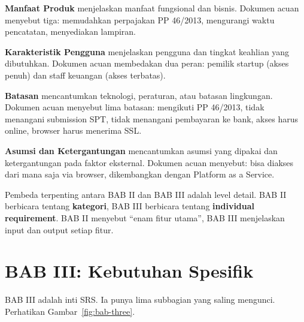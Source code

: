 \documentclass[11pt,a4paper]{article}
\begin{document}
\textbf{Manfaat Produk} menjelaskan manfaat fungsional dan bisnis. Dokumen acuan menyebut tiga: memudahkan perpajakan PP 46/2013, mengurangi waktu pencatatan, menyediakan lampiran.

\textbf{Karakteristik Pengguna} menjelaskan pengguna dan tingkat keahlian yang dibutuhkan. Dokumen acuan membedakan dua peran: pemilik startup (akses penuh) dan staff keuangan (akses terbatas).

\textbf{Batasan} mencantumkan teknologi, peraturan, atau batasan lingkungan. Dokumen acuan menyebut lima batasan: mengikuti PP 46/2013, tidak menangani submission SPT, tidak menangani pembayaran ke bank, akses harus online, browser harus menerima SSL.

\textbf{Asumsi dan Ketergantungan} mencantumkan asumsi yang dipakai dan ketergantungan pada faktor eksternal. Dokumen acuan menyebut: bisa diakses dari mana saja via browser, dikembangkan dengan Platform as a Service.

Pembeda terpenting antara BAB II dan BAB III adalah level detail. BAB II berbicara tentang \textbf{kategori}, BAB III berbicara tentang \textbf{individual requirement}. BAB II menyebut ``enam fitur utama'', BAB III menjelaskan input dan output setiap fitur.

\section{BAB III: Kebutuhan Spesifik}

BAB III adalah inti SRS. Ia punya lima subbagian yang saling mengunci. Perhatikan Gambar~\ref{fig:bab-three}.
\end{document}
